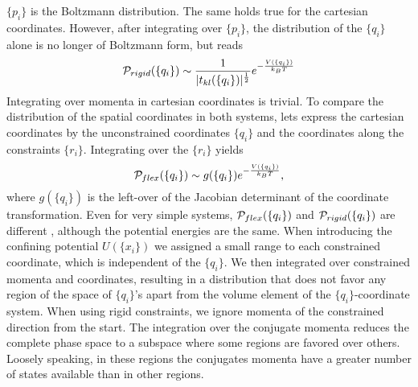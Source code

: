 $\{p_i\}$ is the Boltzmann distribution. The same holds true for the cartesian coordinates. However, 
after integrating over $\{p_i\}$, the distribution of the $\{q_i\}$ alone is no longer of Boltzmann form, but reads
\begin{equation}
{\cal P}_{rigid}(\{q_i\})\sim \frac{1}{|t_{kl}(\{q_i\})|^{\frac{1}{2}}} e^{-\frac{V(\{q_i\})}{k_BT}}
\end{equation}
Integrating over momenta in cartesian coordinates is trivial. To compare the distribution of the spatial
coordinates in both systems, lets express the cartesian coordinates by the unconstrained coordinates $\{q_i\}$ and the 
coordinates along the constraints $\{r_i\}$. Integrating over the $\{r_i\}$ yields
\begin{equation}
{\cal P}_{flex}(\{q_i\}) \sim g(\{q_i\}) e^{-\frac{V(\{q_i\})}{k_BT}},
\end{equation}
where $g(\{q_i\})$ is the left-over of  the Jacobian determinant of the coordinate 
transformation. Even for very simple systems, ${\cal P}_{flex}(\{q_i\})$ and ${\cal P}_{rigid}(\{q_i\})$ are different 
\cite{Helfand_JChemPhys_79, vanKampen_AJP_84, Fixman_PNAS_74}, although the potential energies are the same. 
When introducing the confining potential $U(\{x_i\})$ we assigned a small range to each constrained coordinate, which is independent of the $\{q_i\}$. We then integrated over constrained momenta
and coordinates, resulting in a distribution that does not favor any region of the space of $\{q_i\}$'s apart
from the volume element of the $\{q_i\}$-coordinate system. When using rigid constraints, we ignore momenta of the 
constrained direction from the start. The integration over the conjugate momenta reduces the complete
phase space to a subspace where some regions are favored over others. 
Loosely speaking, in these regions the conjugates momenta have a 
greater number of states available than in other regions.

